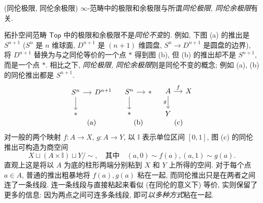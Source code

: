 \begin{remark}
	{(同伦极限, 同伦余极限)}
	$\infty$-范畴中的极限和余极限与所谓\emph{同伦极限, 同伦余极限}有关.
	
	拓扑空间范畴 $\mathsf {Top}$ 中的极限和余极限不是\emph{同伦不变}的. 例如, 下图 (a) 的推出是 $S^{n+1}$ ($S^n$ 是 $n$ 维球面, $D^{n+1}$ 是 $(n+1)$ 维圆盘, $S^n\to D^{n+1}$ 是圆盘的边界), 将 $D^{n+1}$ 替换为与之同伦等价的一个点 $*$ 得到图 (b), 但 (b) 的推出却不是 $S^{n+1}$, 而是一个点 $*$.
	相比之下, \emph{同伦极限, 同伦余极限}则是同伦不变的概念; 例如 (a), (b) 的同伦推出都是 $S^{n+1}$.
	\[
	\begin{array}
		{ccc}
		\begin{tikzcd}[ampersand replacement=\&,column sep=small]
			{S^{n}} \& {D^{n+1}} \\
			{*} \& {}
			\arrow[from=1-1, to=2-1]
			\arrow[from=1-1, to=1-2]
		\end{tikzcd} & \begin{tikzcd}[ampersand replacement=\&,column sep=small]
			{S^{n}} \& {*} \\
			{*} \& {}
			\arrow[from=1-1, to=2-1]
			\arrow[from=1-1, to=1-2]
		\end{tikzcd} & \begin{tikzcd}[ampersand replacement=\&,column sep=small]
			{A} \& {X} \\
			{Y} \& {}
			\arrow["g"',from=1-1, to=2-1]
			\arrow["f",from=1-1, to=1-2]
		\end{tikzcd}\\
		\text{(a)} & \text{(b)} & \text{(c)}
	\end{array}
	\]
	对一般的两个映射 $f\colon A\to X$, $g\colon A\to Y$, 以 $\mathbb I$ 表示单位区间 $[0,1]$, 图 (c) 的同伦推出可构造为商空间
	$$
	X \sqcup (A\times \mathbb I) \sqcup Y \Big/ \sim,\quad\text{其中}\quad
	(a,0)\sim f(a), (a,1)\sim g(a).
	$$
	直观上这是将以 $A$ 为底的柱形两端分别粘到 $X$ 和 $Y$ 上所得的空间. 对于每个点 $a\in A$, 普通的推出粗暴地将 $f(a),g(a)$ 粘在一起, 而同伦推出只是在两者之间连了一条线段. 连一条线段与直接粘起来看似 (在同伦的意义下) 等价, 实则保留了更多的信息: 因为两点之间可连多条线段, 即可\emph{以多种方式}粘在一起.
	\begin{center}
		

\end{center}
\end{remark}
